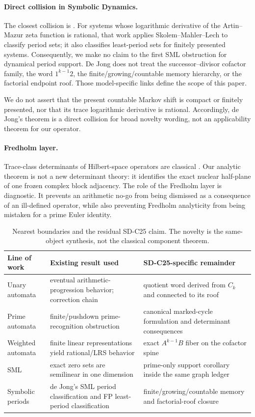 \paragraph{Direct collision in Symbolic Dynamics.}
The closest collision is \citet{deJong2026}.  For systems whose logarithmic
derivative of the Artin--Mazur zeta function is rational, that work applies
Skolem--Mahler--Lech to classify period sets; it also classifies
least-period sets for finitely presented systems.  Consequently, we make no
claim to the first SML obstruction for dynamical period support.  De Jong
does not treat the successor--divisor cofactor family, the word
\(1^{k-1}2\), the finite/growing/countable memory hierarchy, or the
factorial endpoint roof.  Those model-specific links define the scope of
this paper.

We do not assert that the present countable Markov shift is compact or
finitely presented, nor that its trace logarithmic derivative is rational.
Accordingly, de Jong's theorem is a direct collision for broad novelty
wording, not an applicability theorem for our operator.

\paragraph{Fredholm layer.}
Trace-class determinants of Hilbert-space operators are classical
\citep{Simon1977}.  Our analytic theorem is not a new determinant theory:
it identifies the exact nuclear half-plane of one frozen complex block
adjacency.  The role of the Fredholm layer is diagnostic.  It prevents an
arithmetic no-go from being dismissed as a consequence of an ill-defined
operator, while also preventing Fredholm analyticity from being mistaken
for a prime Euler identity.

\begin{table}[t]
\centering
\caption{Nearest boundaries and the residual SD-C25 claim.  The novelty is
the same-object synthesis, not the classical component theorem.}
\label{tab:literature}
\small
\begin{tabularx}{\textwidth}{L{2.8cm}YY}
\toprule
Line of work & Existing result used & SD-C25-specific remainder \\
\midrule
Unary automata
& eventual arithmetic-progression behavior; correction chain
& quotient word derived from \(C_k\) and connected to its roof \\
Prime automata
& finite/pushdown prime-recognition obstruction
& canonical marked-cycle formulation and determinant consequences \\
Weighted automata
& finite linear representations yield rational/LRS behavior
& exact \(A^{k-1}B\) fiber on the cofactor spine \\
SML
& exact zero sets are semilinear in one dimension
& prime-only support corollary inside the same graph ledger \\
Symbolic periods
& de Jong's SML period classification and FP least-period classification
& finite/growing/countable memory and factorial-roof closure \\
\bottomrule
\end{tabularx}
\end{table}

